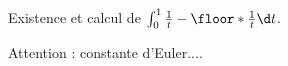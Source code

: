 \begin{enonce}
\begin{exercise}[ID={RMS121-2 E1057 (TPE)},subtitle={},tags={}, difficulty={0}]
  Existence et calcul de $\int_0^1 \frac1t-\floor*{\frac1t} \d t$.
\end{exercise}
\begin{solution}
Attention : constante d'Euler....
\end{solution}
\end{enonce}
